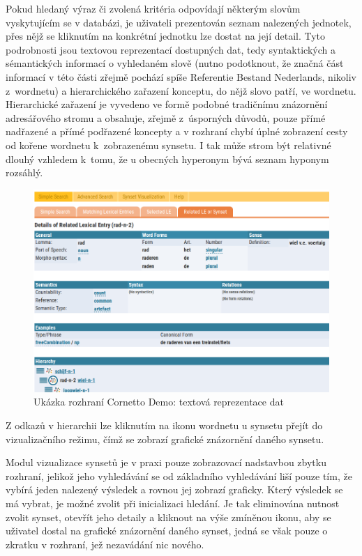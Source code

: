 \documentclass[a4paper, 11pt, oneside, showtrims]{book}
\begin{document}
					Pokud hledaný výraz či zvolená kritéria odpovídají některým slovům vyskytujícím se v databázi, je uživateli prezentován seznam nalezených jednotek, přes nějž se kliknutím na konkrétní jednotku lze dostat na její detail. Tyto podrobnosti jsou textovou reprezentací dostupných dat, tedy syntaktických a sémantických informací o vyhledaném slově (nutno podotknout, že značná část informací v této části zřejmě pochází spíše Referentie Bestand Nederlands, nikoliv z~wordnetu) a hierarchického zařazení konceptu, do nějž slovo patří, ve wordnetu. Hierarchické zařazení je vyvedeno ve formě podobné tradičnímu znázornění adresářového stromu a obsahuje, zřejmě z~úsporných důvodů, pouze přímé nadřazené a přímé podřazené koncepty a v rozhraní chybí úplné zobrazení cesty od kořene wordnetu k~zobrazenému synsetu. I tak může strom být relativné dlouhý vzhledem k~tomu, že u obecných hyperonym bývá seznam hyponym rozsáhlý. 

					\begin{figure}[h]
						\centering
						\includegraphics[width=1.0\textwidth]{cornetto-text1.png}
						\caption{Ukázka rozhraní Cornetto Demo: textová reprezentace dat}
						\label{fig:cornetto-text1}
					\end{figure}

					Z odkazů v hierarchii lze kliknutím na ikonu wordnetu u synsetu přejít do vizualizačního režimu, čímž se zobrazí grafické znázornění daného synsetu. 

					Modul vizualizace synsetů je v praxi pouze zobrazovací nadstavbou zbytku rozhraní, jelikož jeho vyhledávání se od základního vyhledávání liší pouze tím, že vybírá jeden nalezený výsledek a rovnou jej zobrazí graficky. Který výsledek se má vybrat, je možné zvolit při inicializaci hledání. Je tak eliminována nutnost zvolit synset, otevřít jeho detaily a kliknout na výše zmíněnou ikonu, aby se uživatel dostal na grafické znázornění daného synset, jedná se však pouze o zkratku v rozhraní, jež nezavádání nic nového.
\end{document}
